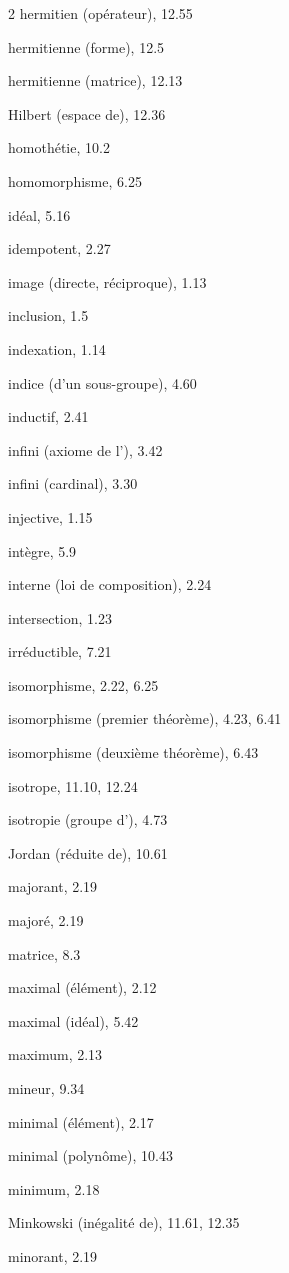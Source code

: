 \begin{multicols}{2}
hermitien (opérateur), 12.55

hermitienne (forme), 12.5

hermitienne (matrice), 12.13

Hilbert (espace de), 12.36

homothétie, 10.2

homomorphisme, 6.25

\medskip
idéal, 5.16

idempotent, 2.27

image (directe, réciproque), 1.13

inclusion, 1.5

indexation, 1.14

indice (d'un sous-groupe), 4.60

inductif, 2.41

infini (axiome de l'), 3.42

infini (cardinal), 3.30

injective, 1.15

intègre, 5.9

interne (loi de composition), 2.24

intersection, 1.23

irréductible, 7.21

isomorphisme, 2.22, 6.25

isomorphisme (premier théorème), 4.23, 6.41

isomorphisme (deuxième théorème), 6.43

isotrope, 11.10, 12.24

isotropie (groupe d'), 4.73

\medskip
{}

Jordan (réduite de), 10.61

\medskip
majorant, 2.19

majoré, 2.19

matrice, 8.3

maximal (élément), 2.12

maximal (idéal), 5.42

maximum, 2.13

mineur, 9.34

minimal (élément), 2.17

minimal (polynôme), 10.43

minimum, 2.18

Minkowski (inégalité de), 11.61, 12.35

minorant, 2.19


\end{multicols}
